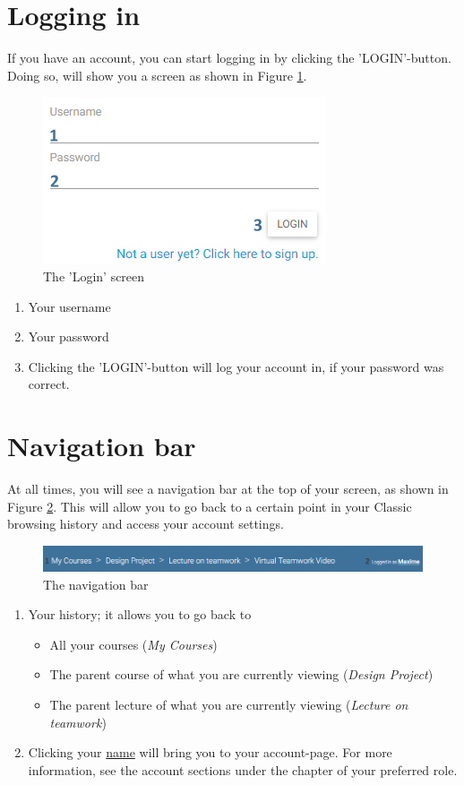 \documentclass[a4paper,11pt]{report}
\begin{document}
\section{Logging in}
If you have an account, you can start logging in by clicking the 'LOGIN'-button. Doing so, will show you a screen as shown in Figure \ref{fig:login}.
\begin{figure}[H]
\centering
\includegraphics[scale=0.55]{imgs/login.png}
\caption{The 'Login' screen}
\label{fig:login}
\end{figure}
\begin{enumerate}
\item Your username
\item Your password
\item Clicking the 'LOGIN'-button will log your account in, if your password was correct.
\end{enumerate}

\section{Navigation bar}
At all times, you will see a navigation bar at the top of your screen, as shown in Figure \ref{fig:navbar}. This will allow you to go back to a certain point in your Classic browsing history and access your account settings.

\begin{figure}[H]
\centering
\includegraphics[scale=0.50]{imgs/navbar.png}
\caption{The navigation bar}
\label{fig:navbar}
\end{figure}
\begin{enumerate}
\item Your history; it allows you to go back to 
	\begin{itemize}
		\item All your courses (\textit{My Courses})
		\item The parent course of what you are currently viewing (\textit{Design Project})
		\item The parent lecture of what you are currently viewing (\textit{Lecture on teamwork})
	\end{itemize}
\item Clicking your \underline{name} will bring you to your account-page. For more information, see the account sections under the chapter of your preferred role.
\end{enumerate}
\end{document}
